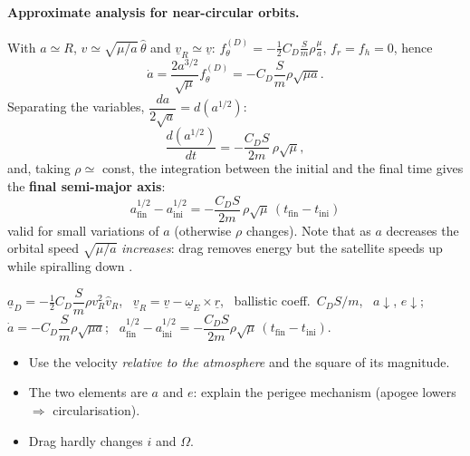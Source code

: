 \paragraph{Approximate analysis for near-circular orbits.} With $a\simeq R$, $v\simeq\sqrt{\mu/a}\,\hat\theta$ and $\underline v_R\simeq\underline v$:
$f_\theta^{(D)}=-\frac12C_D\frac Sm\rho\frac\mu a$, $f_r=f_h=0$, hence
\begin{equation}
\dot{a}=\frac{2a^{3/2}}{\sqrt{\mu}}f_{\theta}^{(D)}=-C_{D}\frac{S}{m}\rho\sqrt{\mu a}.
\end{equation}
Separating the variables, $\dfrac{da}{2\sqrt a}=d\!\left(a^{1/2}\right)$:
\begin{equation}
\frac{d\left(a^{1/2}\right)}{dt}=-\frac{C_DS}{2m}\,\rho\sqrt{\mu},
\end{equation}
and, taking $\rho\simeq$ const, the integration between the initial and the final time gives the
\textbf{final semi-major axis}:
\begin{equation}
a_{\text{fin}}^{1/2}-a_{\text{ini}}^{1/2}=-\frac{C_{D}S}{2m}\,\rho\sqrt{\mu}\,\left(t_{\text{fin}}-t_{\text{ini}}\right)
\end{equation}
valid for small variations of $a$ (otherwise $\rho$ changes). Note that as $a$ decreases the orbital speed $\sqrt{\mu/a}$ \emph{increases}:
drag removes energy but the satellite speeds up while spiralling down \notinnotes.

\begin{keyf}
$\underline a_D=-\frac12C_D\dfrac Sm\rho v_R^2\hat v_R$, \ $\underline v_R=\underline v-\underline\omega_E\times\underline r$, \ ballistic coeff.\ $C_DS/m$, \
$a\downarrow$, $e\downarrow$; \ $\dot a=-C_D\dfrac Sm\rho\sqrt{\mu a}$; \
$a_{\text{fin}}^{1/2}-a_{\text{ini}}^{1/2}=-\dfrac{C_DS}{2m}\rho\sqrt{\mu}\,(t_{\text{fin}}-t_{\text{ini}})$.
\end{keyf}

\pitfalls
\begin{itemize}
\item Use the velocity \emph{relative to the atmosphere} and the square of its magnitude.
\item The two elements are $a$ and $e$: explain the perigee mechanism (apogee lowers $\Rightarrow$ circularisation).
\item Drag hardly changes $i$ and $\Omega$.
\end{itemize}

